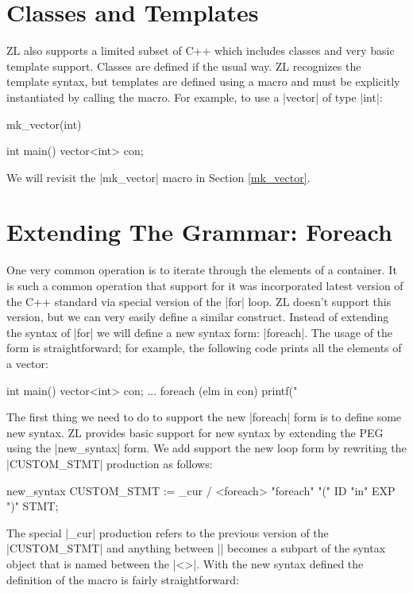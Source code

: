 \section{Classes and Templates}
\label{template-intro}

ZL also supports a limited subset of C++ which includes classes and
very basic template support.  Classes are defined if the usual way.  ZL
recognizes the template syntax, but templates are defined using a
macro and must be explicitly instantiated by calling the macro.  For
example, to use a |vector| of type |int|:

\begin{code}
mk_vector(int)

int main() {
  vector<int> con;
}
\end{code}

We will revisit the |mk_vector| macro in Section \ref{mk_vector}.

\section{Extending The Grammar: Foreach}
\label{foreach}

One very common operation is to iterate through the elements of a
container.  It is such a common operation that support for it was
incorporated latest version of the C++ standard via special version of
the |for| loop.  ZL doesn't support this version, but we can very
easily define a similar construct.  Instead of extending the syntax of
|for| we will define a new syntax form: |foreach|.  The usage of the
form is straightforward; for example, the following code prints all the
elements of a vector:
\begin{code}
int main() {
  vector<int> con;
  ...
  foreach (elm in con) {
    printf("%
  }
}
\end{code}

The first thing we need to do to support the new |foreach| form is to
define some new syntax.  ZL provides basic support for new syntax by
extending the PEG using the |new_syntax| form.  We add support the new
loop form by rewriting the |CUSTOM_STMT| production as follows:
\begin{code}
new_syntax {
  CUSTOM_STMT := _cur / <foreach> "foreach" "(" {ID} "in" {EXP} ")" {STMT};
}
\end{code}
The special |_cur| production refers to the previous version of the
|CUSTOM_STMT| and anything between |{}| becomes a subpart of the
syntax object that is named between the |<>|. 
With the new syntax defined the definition of the macro is fairly
straightforward:

